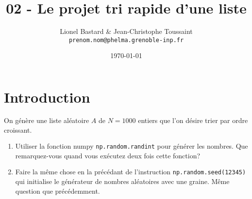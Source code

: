 \documentclass[a4paper, 12pt]{article}
\begin{document}


\title{02 - Le projet tri rapide d'une liste}

\author{Lionel Bastard \& Jean-Christophe Toussaint\\
 \texttt{prenom.nom@phelma.grenoble-inp.fr}}
\date{\today}
 
\maketitle



\section{Introduction}

On génère une liste aléatoire $A$  de $N=1000$ entiers que l'on désire
trier par ordre croissant. 

\begin{enumerate} 
\item Utiliser la  fonction  numpy {\tt np.random.randint} pour générer les nombres.
Que remarquez-vous quand vous exécutez deux fois cette fonction?

\item Faire la même chose en la précédant de l'instruction 
{\tt np.random.seed(12345)} qui initialise le générateur de nombres aléatoires avec une graine.
Même question que précédemment.
\end{enumerate} 
\end{document}
